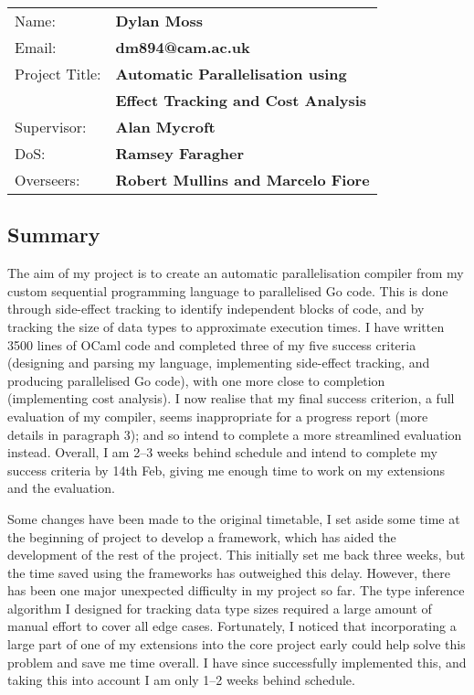 \documentclass[12pt,a4paper,twoside,openright]{report}
\begin{document}
{
\begin{tabular}{ll}
  Name:          & \bf Dylan Moss                       \\[3pt]
  Email:         & \bf dm894@cam.ac.uk                  \\[3pt]
  Project Title: & \bf Automatic Parallelisation using  \\ & \bf Effect Tracking and Cost Analysis \\[3pt]
  Supervisor:    & \bf Alan Mycroft                     \\[3pt]
  DoS:           & \bf Ramsey Faragher                  \\[3pt]
  Overseers:     & \bf Robert Mullins and Marcelo Fiore \\[3pt]
\end{tabular}
}

\vspace{5mm}

\subsection*{Summary}

The aim of my project is to create an automatic parallelisation compiler from my custom sequential programming language to parallelised Go code. This is done through side-effect tracking to identify independent blocks of code, and by tracking the size of data types to approximate execution times. I have written 3500 lines of OCaml code and completed three of my five success criteria (designing and parsing my language, implementing side-effect tracking, and producing parallelised Go code), with one more close to completion (implementing cost analysis). I now realise that my final success criterion, a full evaluation of my compiler, seems inappropriate for a progress report (more details in paragraph 3); and so intend to complete a more streamlined evaluation instead. Overall, I am 2--3 weeks behind schedule and intend to complete my success criteria by 14th Feb, giving me enough time to work on my extensions and the evaluation.

Some changes have been made to the original timetable, I set aside some time at the beginning of project to develop a framework, which has aided the development of the rest of the project. This initially set me back three weeks, but the time saved using the frameworks has outweighed this delay. However, there has been one major unexpected difficulty in my project so far. The type inference algorithm I designed for tracking data type sizes required a large amount of manual effort to cover all edge cases. Fortunately, I noticed that incorporating a large part of one of my extensions into the core project early could help solve this problem and save me time overall. I have since successfully implemented this, and taking this into account I am only 1--2 weeks behind schedule.
\end{document}
